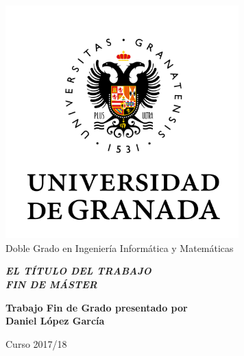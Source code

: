 
\thispagestyle{empty}


\begin{center}

\includegraphics[width=9cm]{simbolo_color.png}\\[2cm]
{\Large\sffamily Doble Grado en Ingeniería Informática y Matemáticas}\\[3mm]


\vspace{2cm}


\begin{Large}
{\slshape\bfseries  EL T\'ITULO DEL TRABAJO\\[6mm]
FIN DE M\'ASTER}
\end{Large}

\vspace{2cm}

\vfill

\begin{large}
{\bf Trabajo Fin de Grado presentado por \\[3mm]
Daniel López García}
\end{large}


\vspace{1.5cm}

\begin{Large}
Curso 2017/18
\end{Large}
\end{center}





